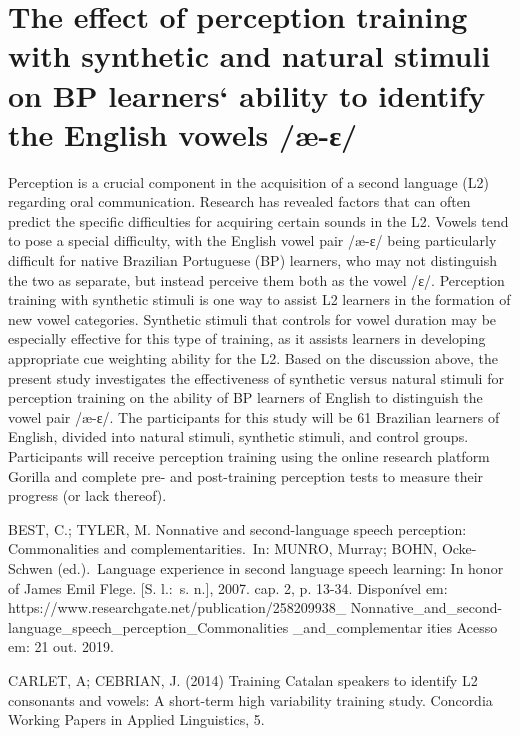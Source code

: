 \chapter{The effect of perception training with synthetic and natural stimuli on BP learners` ability to identify the English vowels /æ-ɛ/}\label{ch:elisabethannb20}
\begin{affils}
\end{affils}

Perception is a crucial component in the acquisition of a second language (L2) regarding oral communication. Research has revealed factors that can often predict the specific difficulties for acquiring certain sounds in the L2. Vowels tend to pose a special difficulty, with the English vowel pair /æ-ɛ/ being particularly difficult for native Brazilian Portuguese (BP) learners, who may not distinguish the two as separate, but instead perceive them both as the vowel /ɛ/. Perception training with synthetic stimuli is one way to assist L2 learners in the formation of new vowel categories. Synthetic stimuli that controls for vowel duration may be especially effective for this type of training, as it assists learners in developing appropriate cue weighting ability for the L2. Based on the discussion above, the present study investigates the effectiveness of synthetic versus natural stimuli for perception training on the ability of BP learners of English to distinguish the vowel pair /æ-ɛ/. The participants for this study will be 61 Brazilian learners of English, divided into natural stimuli, synthetic stimuli, and control groups. Participants will receive perception training using the online research platform Gorilla and complete pre- and post-training perception tests to measure their progress (or lack thereof).

\vspace{1ex}

BEST, C.; TYLER, M. Nonnative and second-language speech perception:
Commonalities and complementarities. In: MUNRO, Murray; BOHN, Ocke-Schwen (ed.). Language experience in second language speech learning: In honor of James Emil Flege. [S. l.: s. n.], 2007. cap. 2, p. 13-34. Disponível em: https://www.researchgate.net/publication/258209938\_ Nonnative\_and\_second-language\_speech\_perception\_Commonalities \_and\_complementar ities Acesso em: 21 out. 2019.

CARLET, A; CEBRIAN, J. (2014) Training Catalan speakers to identify L2
consonants and vowels: A short-term high variability training study. Concordia Working Papers in Applied Linguistics, 5.

